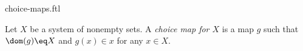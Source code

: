 \documentclass{naproche-library}
\begin{document}
\begin{smodule}[title=Choice Maps]{choice-maps.ftl}

\begin{definition}[forthel,id=FOUNDATIONS_10_1352015487625913]
  Let $X$ be a system of nonempty sets.
  A \emph{choice map for $X$} is a map $g$ such that $\dom(g) \eq X$ and $g(x) \in x$ for any $x \in X$.
\end{definition}
\end{smodule}
\end{document}
